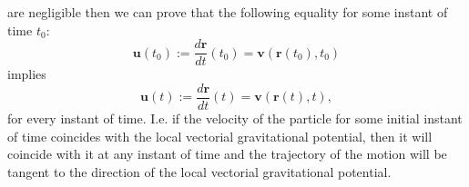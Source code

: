 \documentclass{article}
\theoremstyle{definition}
\theoremstyle{remark}
\renewcommand{\vec}[1]{\mathbf{#1}}
\begin{document}
are negligible then we can prove that the following equality for
some instant of time $t_0$:
\begin{equation*}
\vec u(t_0):=\frac{d\vec r}{dt}(t_0)=\vec v\left(\vec
r(t_0),t_0\right)
\end{equation*}
implies
\begin{equation*}
\vec u(t):=\frac{d\vec r}{dt}(t)=\vec v\left(\vec r(t),t\right),
\end{equation*}
for every instant of time. I.e. if the velocity of the particle for
some initial instant of time coincides with the local vectorial
gravitational potential, then it will coincide with it at any
instant of time and the trajectory of the motion will be tangent to
the direction of the local vectorial gravitational potential.
\end{document}
